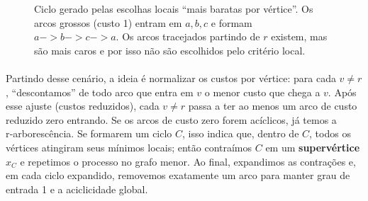 \documentclass[12pt,a4paper]{article}
\def\emph#1{#1}%
\def\to{->}%
\begin{document}
\begin{figure}[htbp]
    \centering
    \caption{Ciclo gerado pelas escolhas locais “mais baratas por vértice”. Os arcos grossos (custo 1) entram em \(a,b,c\) e formam \(a\to b\to c\to a\). Os arcos tracejados partindo de \(r\) existem, mas são mais caros e por isso não são escolhidos pelo critério local.}
    \label{fig:chu-liu-cycle-micro}
\end{figure}

\paragraph{}
Partindo desse cenário, a ideia é \emph{normalizar os custos por vértice}: para cada \(v\neq r\), “descontamos” de todo arco que entra em \(v\) o menor custo que chega a \(v\). Após esse ajuste (custos reduzidos), cada \(v\neq r\) passa a ter ao menos um arco de custo reduzido zero entrando. Se os arcos de custo zero forem acíclicos, já temos a r‑arborescência. Se formarem um ciclo \(C\), isso indica que, dentro de \(C\), todos os vértices atingiram seus mínimos locais; então \emph{contraímos} \(C\) em um \textbf{supervértice} \(x_C\) e repetimos o processo no grafo menor. Ao final, \emph{expandimos} as contrações e, em cada ciclo expandido, removemos exatamente um arco para manter grau de entrada 1 e a aciclicidade global.
\end{document}
